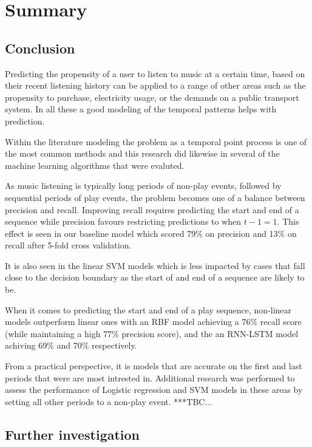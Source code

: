 
\chapter{Summary} %

\label{Chapter6} 

\section{Conclusion}

Predicting the propensity of a user to listen to music at a certain time, based on their recent listening history can be applied to a range of other areas such as the propensity to purchase, electricity usage, or the demands on a public transport system. In all these a good modeling of the temporal patterns helps with prediction.

Within the literature modeling the problem as a temporal point process is one of the most common methods and this research did likewise in several of the machine learning algorithms that were evaluted.

As music listening is typically long periods of non-play events, followed by sequential periods of play events, the problem becomes one of a balance between precision and recall. Improving recall requires predicting the start and end of a sequence while precision favours restricting predictions to when $t-1 = 1$. This effect is seen in our baseline model which scored 79\% on precision and 13\% on recall after 5-fold cross validation.

It is also seen in the linear SVM models which is less impacted by cases that fall close to the decision boundary as the start of and end of a sequence are likely to be.

When it comes to predicting the start and end of a play sequence, non-linear models outperform linear ones with an RBF model achieving a 76\% recall score (while maintaining a high 77\% precision score), and the an RNN-LSTM model achiving 69\% and 70\% respectively.

From a practical perspective, it is models that are accurate on the first and last periods that were are most intrested in. Additional research was performed to assess the performance of Logistic regression and SVM models in these areas by setting all other periods to a non-play event. ***TBC...

\section{Further investigation}

